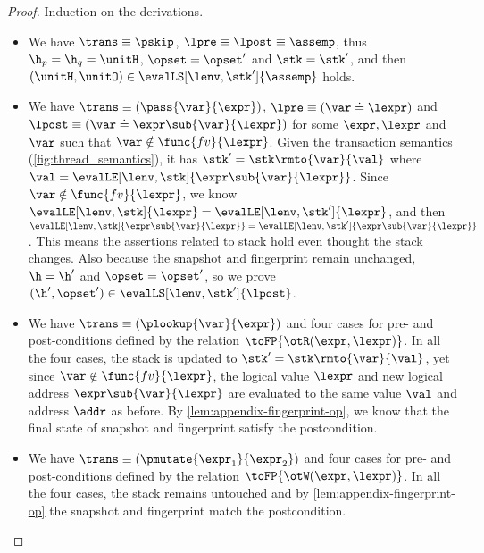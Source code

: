 \begin{proof}
Induction on the derivations.

\begin{itemize}

\item {}
We have \(\trans \equiv \pskip\), \( \lpre \equiv \lpost \equiv \assemp \), thus \( \h_{p} = \h_{q} = \unitH \), \( \opset = \opset' \) and \( \stk = \stk' \), and then \( (\unitH,\unitO ) \in \evalLS[\lenv, \stk']{\assemp} \) holds.

\item {}
We have \(\trans \equiv ( \pass{\var}{\expr} ) \), \( \lpre \equiv ( \var \doteq \lexpr ) \) and \( \lpost \equiv ( \var \doteq \expr\sub{\var}{\lexpr} ) \) 
for some \( \expr, \lexpr \) and \( \var \) such that \( \var \notin \func{fv}{\lexpr}\).
Given the transaction semantics (\cref{fig:thread_semantics}), it has \( \stk' = \stk\rmto{\var}{\val} \) where \( \val = \evalLE[\lenv, \stk]{\expr\sub{\var}{\lexpr}} \).
Since \( \var \notin \func{fv}{\lexpr} \), we know \( \evalLE[\lenv, \stk]{\lexpr} = \evalLE[\lenv, \stk']{\lexpr} \), and then \( \evalLE[\lenv, \stk]{\expr\sub{\var}{\lexpr}} = \evalLE[\lenv, \stk']{\expr\sub{\var}{\lexpr}} \).
This means the assertions related to stack hold even thought the stack changes.
Also because the snapshot and fingerprint remain unchanged, \ie \( \h = \h' \) and \( \opset = \opset' \), so we prove \( (\h', \opset' ) \in \evalLS[\lenv, \stk']{\lpost} \).

\item {}
We have \(\trans \equiv ( \plookup{\var}{\expr} ) \) and four cases for pre- and post-conditions defined by the relation \( \toFP{\otR(\expr, \lexpr)}\).
In all the four cases, the stack is updated to \( \stk' = \stk\rmto{\var}{\val} \), yet since \( \var \notin \func{fv}{\lexpr}\), the logical value \( \lexpr \) and new logical address \( \expr\sub{\var}{\lexpr}\) are evaluated to the same value \( \val \) and address \( \addr \) as before.
By \cref{lem:appendix-fingerprint-op}, we know that the final state of snapshot and fingerprint satisfy the postcondition.

\item {}
We have  \( \trans \equiv (\pmutate{\expr_{1}}{\expr_{2}}) \) and four cases for pre- and post-conditions defined by the relation \( \toFP{\otW(\expr, \lexpr)}\). 
In all the four cases, the stack remains untouched and  by \cref{lem:appendix-fingerprint-op} the snapshot and fingerprint match the postcondition.


\end{itemize}
\end{proof}
